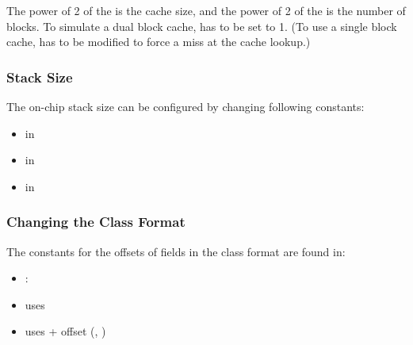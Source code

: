 The power of 2 of the  is the cache size, and the
power of 2 of the  is the number of blocks. To
simulate a dual block cache,  has to be set to 1.
(To use a single block cache,  has to be modified to
force a miss at the cache lookup.)

\subsubsection{Stack Size}

The on-chip stack size can be configured by changing following
constants:

\begin{itemize}
    \item {} in 
    \item {} in 
    \item {} in 
\end{itemize}

\subsubsection{Changing the Class Format}

The constants for the offsets of fields in the class format are found
in:

\begin{itemize}
    \item {}: 
    \item {} uses 
    \item {} uses  + offset
        (, )
\end{itemize}




%
%
